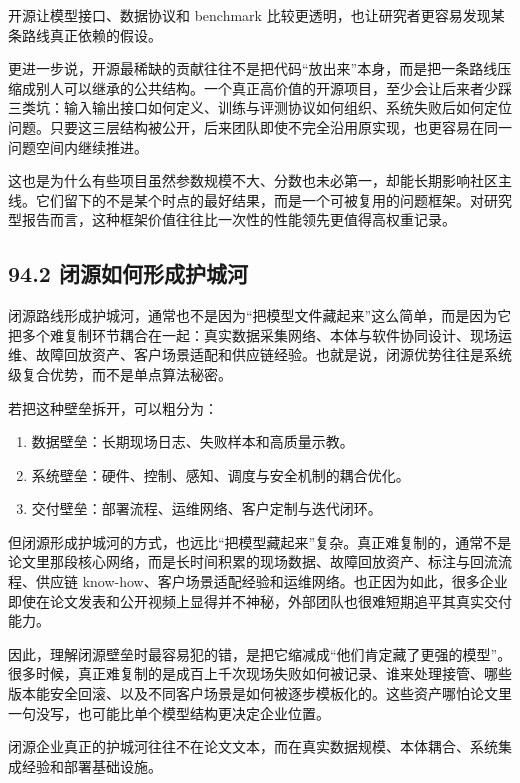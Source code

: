开源让模型接口、数据协议和 benchmark 比较更透明，也让研究者更容易发现某条路线真正依赖的假设。

更进一步说，开源最稀缺的贡献往往不是把代码“放出来”本身，而是把一条路线压缩成别人可以继承的公共结构。一个真正高价值的开源项目，至少会让后来者少踩三类坑：输入输出接口如何定义、训练与评测协议如何组织、系统失败后如何定位问题。只要这三层结构被公开，后来团队即使不完全沿用原实现，也更容易在同一问题空间内继续推进。

这也是为什么有些项目虽然参数规模不大、分数也未必第一，却能长期影响社区主线。它们留下的不是某个时点的最好结果，而是一个可被复用的问题框架。对研究型报告而言，这种框架价值往往比一次性的性能领先更值得高权重记录。

\subsection*{94.2 闭源如何形成护城河}


闭源路线形成护城河，通常也不是因为“把模型文件藏起来”这么简单，而是因为它把多个难复制环节耦合在一起：真实数据采集网络、本体与软件协同设计、现场运维、故障回放资产、客户场景适配和供应链经验。也就是说，闭源优势往往是系统级复合优势，而不是单点算法秘密。

若把这种壁垒拆开，可以粗分为：

\begin{enumerate}
\item 数据壁垒：长期现场日志、失败样本和高质量示教。
\item 系统壁垒：硬件、控制、感知、调度与安全机制的耦合优化。
\item 交付壁垒：部署流程、运维网络、客户定制与迭代闭环。
\end{enumerate}

但闭源形成护城河的方式，也远比“把模型藏起来”复杂。真正难复制的，通常不是论文里那段核心网络，而是长时间积累的现场数据、故障回放资产、标注与回流流程、供应链 know-how、客户场景适配经验和运维网络。也正因为如此，很多企业即使在论文发表和公开视频上显得并不神秘，外部团队也很难短期追平其真实交付能力。

因此，理解闭源壁垒时最容易犯的错，是把它缩减成“他们肯定藏了更强的模型”。很多时候，真正难复制的是成百上千次现场失败如何被记录、谁来处理接管、哪些版本能安全回滚、以及不同客户场景是如何被逐步模板化的。这些资产哪怕论文里一句没写，也可能比单个模型结构更决定企业位置。

闭源企业真正的护城河往往不在论文文本，而在真实数据规模、本体耦合、系统集成经验和部署基础设施。


